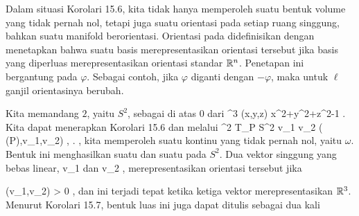 {}
{

Dalam situasi
Korolari 15.6,
kita tidak hanya memperoleh suatu bentuk volume yang tidak pernah nol, tetapi juga suatu orientasi pada setiap ruang singgung, bahkan suatu manifold berorientasi. Orientasi pada
 didefinisikan dengan menetapkan bahwa suatu basis
 merepresentasikan orientasi tersebut jika basis yang diperluas
 merepresentasikan orientasi standar ${\mathbb R}^n$. Penetapan ini bergantung pada $\varphi$. Sebagai contoh, jika $\varphi$ diganti dengan $- \varphi$, maka untuk $\ell$ ganjil orientasinya berubah.

}

{

Kita memandang
 $2$, yaitu
$S^2$, sebagai
di atas $0$ dari
\maabbeledisp {\varphi} {\R^3} {\R
} {(x,y,z)} { x^2+y^2+z^2-1
} {.}
Kita dapat menerapkan
Korolari 15.6
dan melalui
\maabbeledisp {} {\bigwedge^2 T_P S^2} {\R
} {v_1 \wedge v_2 } { \det  (
 \, \varphi(P),v_1,v_2)
} {,}
 {.} {,}
kita memperoleh suatu
kontinu yang tidak pernah nol, yaitu $\omega$. Bentuk ini menghasilkan suatu
dan suatu
pada $S^2$. Dua vektor singgung yang bebas linear,
\mathkor {} {v_1} {dan} {v_2} {,}
merepresentasikan orientasi tersebut jika

\mavergleichskette
{\vergleichskette
{ \omega(v_1,v_2)
}
{ > }{ 0
}
{  }{
}
{    }{
}
{   }{
}
}
{}{}{,}
dan ini terjadi tepat ketika ketiga vektor
 merepresentasikan
${\mathbb R}^3$. Menurut
Korolari 15.7,
bentuk luas ini juga dapat ditulis sebagai dua kali

 {  }

}

